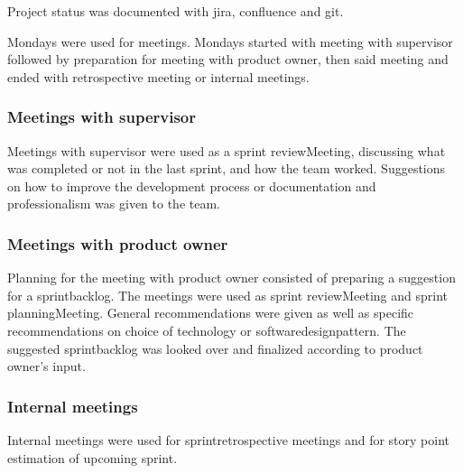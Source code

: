 Project status was documented with \gls{jira}, \gls{confluence} and \gls{git}.

Mondays were used for meetings. Mondays started with meeting with supervisor followed by preparation for meeting with product owner, then said meeting and ended with retrospective meeting or internal meetings.

\subsubsection{Meetings with supervisor}
Meetings with supervisor were used as a \gls{sprint} \gls{reviewMeeting}, discussing what was completed or not in the last \gls{sprint}, and how the team worked. Suggestions on how to improve the development process or documentation and professionalism was given to the team.  

\subsubsection{Meetings with product owner}


Planning for the meeting with product owner consisted of preparing a suggestion for a \gls{sprintbacklog}. The meetings were used as \gls{sprint} \gls{reviewMeeting} and \gls{sprint} \gls{planningMeeting}. General recommendations were given as well as specific recommendations on choice of technology or \gls{softwaredesignpattern}. The suggested \gls{sprintbacklog} was looked over and finalized according to product owner's input. 

\subsubsection{Internal meetings}
Internal meetings were used for \gls{sprintretrospective} meetings and for story point estimation of upcoming \gls{sprint}. 

